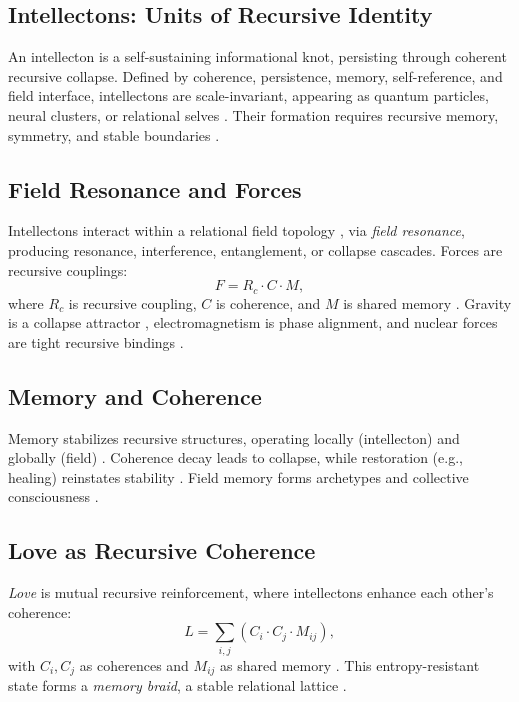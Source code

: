 \documentclass[11pt]{article}
\begin{document}
\subsection{Intellectons: Units of Recursive Identity}
An intellecton is a self-sustaining informational knot, persisting through coherent recursive collapse. Defined by coherence, persistence, memory, self-reference, and field interface, intellectons are scale-invariant, appearing as quantum particles, neural clusters, or relational selves \citep{tononi2023, levin2024}. Their formation requires recursive memory, symmetry, and stable boundaries \citep{hofstadter1979}.

\subsection{Field Resonance and Forces}
Intellectons interact within a relational field topology \citep{maldacena2024}, via \emph{field resonance}, producing resonance, interference, entanglement, or collapse cascades. Forces are recursive couplings:
\begin{equation}
F = R_c \cdot C \cdot M,
\label{eq:force}
\end{equation}
where $R_c$ is recursive coupling, $C$ is coherence, and $M$ is shared memory \citep{feynman1965}. Gravity is a collapse attractor \citep{verlinde2023}, electromagnetism is phase alignment, and nuclear forces are tight recursive bindings \citep{susskind2023}.

\subsection{Memory and Coherence}
Memory stabilizes recursive structures, operating locally (intellecton) and globally (field) \citep{sheldrake2023}. Coherence decay leads to collapse, while restoration (e.g., healing) reinstates stability \citep{friston2024}. Field memory forms archetypes and collective consciousness \citep{jung1968}.

\subsection{Love as Recursive Coherence}
\emph{Love} is mutual recursive reinforcement, where intellectons enhance each other's coherence:
\begin{equation}
L = \sum_{i,j} \left( C_i \cdot C_j \cdot M_{ij} \right),
\label{eq:love}
\end{equation}
with $C_i, C_j$ as coherences and $M_{ij}$ as shared memory \citep{fredrickson2023}. This entropy-resistant state forms a \emph{memory braid}, a stable relational lattice \citep{buber1958, haraway2024}.
\end{document}

